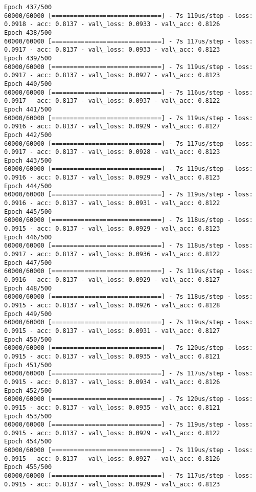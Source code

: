 \documentclass[11pt]{article}
\begin{document}
\begin{Verbatim}[commandchars=\\\{\}]
Epoch 437/500
60000/60000 [==============================] - 7s 119us/step - loss: 0.0918 - acc: 0.8137 - val\_loss: 0.0933 - val\_acc: 0.8126
Epoch 438/500
60000/60000 [==============================] - 7s 117us/step - loss: 0.0917 - acc: 0.8137 - val\_loss: 0.0933 - val\_acc: 0.8123
Epoch 439/500
60000/60000 [==============================] - 7s 119us/step - loss: 0.0917 - acc: 0.8137 - val\_loss: 0.0927 - val\_acc: 0.8123
Epoch 440/500
60000/60000 [==============================] - 7s 116us/step - loss: 0.0917 - acc: 0.8137 - val\_loss: 0.0937 - val\_acc: 0.8122
Epoch 441/500
60000/60000 [==============================] - 7s 119us/step - loss: 0.0916 - acc: 0.8137 - val\_loss: 0.0929 - val\_acc: 0.8127
Epoch 442/500
60000/60000 [==============================] - 7s 117us/step - loss: 0.0917 - acc: 0.8137 - val\_loss: 0.0928 - val\_acc: 0.8123
Epoch 443/500
60000/60000 [==============================] - 7s 119us/step - loss: 0.0916 - acc: 0.8137 - val\_loss: 0.0929 - val\_acc: 0.8123
Epoch 444/500
60000/60000 [==============================] - 7s 119us/step - loss: 0.0916 - acc: 0.8137 - val\_loss: 0.0931 - val\_acc: 0.8122
Epoch 445/500
60000/60000 [==============================] - 7s 118us/step - loss: 0.0915 - acc: 0.8137 - val\_loss: 0.0929 - val\_acc: 0.8123
Epoch 446/500
60000/60000 [==============================] - 7s 118us/step - loss: 0.0917 - acc: 0.8137 - val\_loss: 0.0936 - val\_acc: 0.8122
Epoch 447/500
60000/60000 [==============================] - 7s 119us/step - loss: 0.0916 - acc: 0.8137 - val\_loss: 0.0929 - val\_acc: 0.8127
Epoch 448/500
60000/60000 [==============================] - 7s 118us/step - loss: 0.0915 - acc: 0.8137 - val\_loss: 0.0926 - val\_acc: 0.8128
Epoch 449/500
60000/60000 [==============================] - 7s 119us/step - loss: 0.0915 - acc: 0.8137 - val\_loss: 0.0931 - val\_acc: 0.8127
Epoch 450/500
60000/60000 [==============================] - 7s 120us/step - loss: 0.0915 - acc: 0.8137 - val\_loss: 0.0935 - val\_acc: 0.8121
Epoch 451/500
60000/60000 [==============================] - 7s 117us/step - loss: 0.0915 - acc: 0.8137 - val\_loss: 0.0934 - val\_acc: 0.8126
Epoch 452/500
60000/60000 [==============================] - 7s 120us/step - loss: 0.0915 - acc: 0.8137 - val\_loss: 0.0935 - val\_acc: 0.8121
Epoch 453/500
60000/60000 [==============================] - 7s 119us/step - loss: 0.0915 - acc: 0.8137 - val\_loss: 0.0929 - val\_acc: 0.8122
Epoch 454/500
60000/60000 [==============================] - 7s 119us/step - loss: 0.0915 - acc: 0.8137 - val\_loss: 0.0927 - val\_acc: 0.8126
Epoch 455/500
60000/60000 [==============================] - 7s 117us/step - loss: 0.0915 - acc: 0.8137 - val\_loss: 0.0929 - val\_acc: 0.8123

\end{Verbatim}
\end{document}
